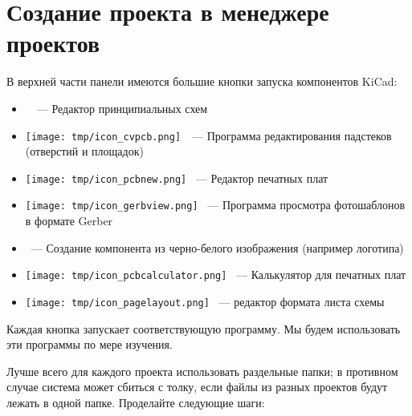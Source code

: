 \section{Создание проекта в менеджере проектов }

В верхней части панели  
имеются большие кнопки запуска компонентов KiCad:

\begin{itemize}
\item \icoesch\ \ --- Редактор принципиальных схем
\item
\texttt{[image: tmp/icon\_cvpcb.png]}\
\
--- Программа редактирования падстеков (отверстий и площадок)
\item 
\texttt{[image: tmp/icon\_pcbnew.png]}
\ ---
Редактор печатных плат
\item
\texttt{[image: tmp/icon\_gerbview.png]}
\ --- Программа просмотра фотошаблонов в формате Gerber
\item \prog{Bitmap2Component}\ --- Создание компонента из черно-белого
изображения (например логотипа)
\item 
\texttt{[image: tmp/icon\_pcbcalculator.png]}
\ --- Калькулятор для печатных плат
\item 
\texttt{[image: tmp/icon\_pagelayout.png]}
\ --- редактор формата листа схемы
\end{itemize}

Каждая кнопка запускает соответствующую программу. Мы будем использовать эти
программы по мере изучения.

\bigskip
Лучше всего для каждого проекта использовать раздельные папки; в противном
случае система может сбиться с толку, если файлы из разных проектов будут лежать
в одной папке. Проделайте следующие шаги:

